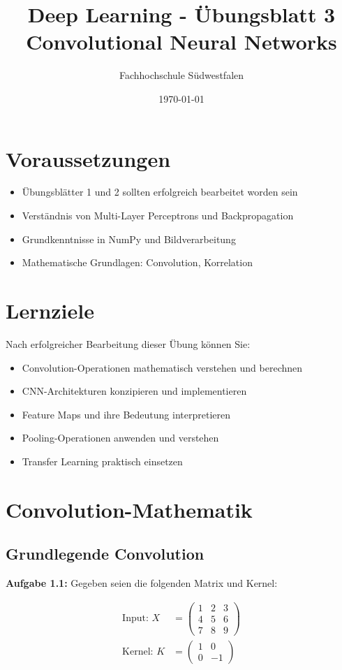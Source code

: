 \documentclass[12pt,a4paper]{article}
\title{\textbf{Deep Learning - Übungsblatt 3} \\ \large Convolutional Neural Networks}
\author{Fachhochschule Südwestfalen}
\date{\today}
\begin{document}
\maketitle

\section*{Voraussetzungen}
\begin{itemize}
    \item Übungsblätter 1 und 2 sollten erfolgreich bearbeitet worden sein
    \item Verständnis von Multi-Layer Perceptrons und Backpropagation
    \item Grundkenntnisse in NumPy und Bildverarbeitung
    \item Mathematische Grundlagen: Convolution, Korrelation
\end{itemize}

\section*{Lernziele}
Nach erfolgreicher Bearbeitung dieser Übung können Sie:
\begin{itemize}
    \item Convolution-Operationen mathematisch verstehen und berechnen
    \item CNN-Architekturen konzipieren und implementieren
    \item Feature Maps und ihre Bedeutung interpretieren
    \item Pooling-Operationen anwenden und verstehen
    \item Transfer Learning praktisch einsetzen
\end{itemize}

\section{Convolution-Mathematik}

\subsection{Grundlegende Convolution}

\textbf{Aufgabe 1.1:} Gegeben seien die folgenden Matrix und Kernel:

\begin{align}
\text{Input: } X &= \begin{pmatrix} 1 & 2 & 3 \\ 4 & 5 & 6 \\ 7 & 8 & 9 \end{pmatrix} \\
\text{Kernel: } K &= \begin{pmatrix} 1 & 0 \\ 0 & -1 \end{pmatrix}
\end{align}
\end{document}
